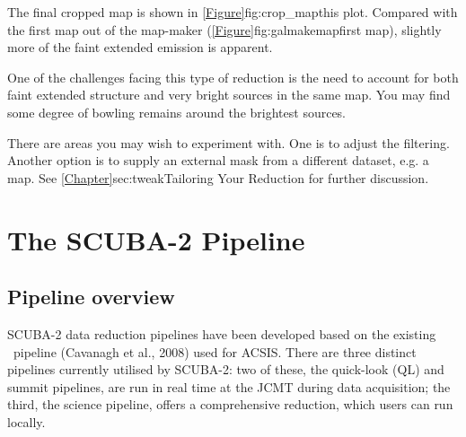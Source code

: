 \documentclass[11pt,oneside,chapters]{starlink}
\begin{document}
\begin{terminalv}
\end{terminalv}
The final cropped map is shown in \cref{Figure}{fig:crop_map}{this plot}.
Compared with the first map out of the map-maker
(\cref{Figure}{fig:galmakemap}{first map}),
slightly more of the faint extended emission is apparent.

One of the challenges facing this type of reduction is the need to
account for both faint extended structure and very bright sources in
the same map. You may find some degree of bowling remains around the
brightest sources.

There are areas you may wish to experiment with. One is to adjust the
filtering. Another option is to supply an external mask from
a different dataset, e.g. a
 map.
See \cref{Chapter}{sec:tweak}{Tailoring Your Reduction} for further
discussion.



\clearpage
\chapter{The SCUBA-2 Pipeline}
\label{sec:pipe}

\section{Pipeline overview}

SCUBA-2 data reduction pipelines have been developed based on the
existing \oracdr\ pipeline (Cavanagh et al., 2008\cite{oracdr}) used
for ACSIS. There are three distinct pipelines currently utilised by
SCUBA-2: two of these, the quick-look (QL) and summit pipelines, are
run in real time at the JCMT during data acquisition; the third, the science
pipeline, offers a comprehensive reduction, which users can run locally.
\end{document}

